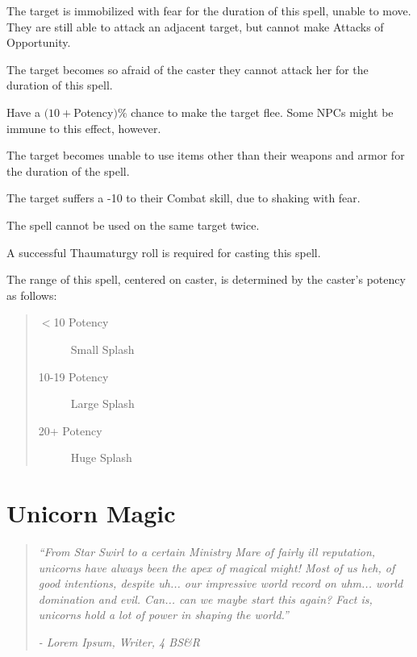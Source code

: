 \documentclass[11pt,a4paper,twocolumn]{book}
\begin{document}
\begin{compactitem}
	\item The target is immobilized with fear for the duration of this spell, unable to move. They are still able to attack an adjacent target, but cannot make Attacks of Opportunity.
	\item The target becomes so afraid of the caster they cannot attack her for the duration of this spell.
	\item Have a $(10 + $Potency$)\%$ chance to make the target flee. Some NPCs might be immune to this effect, however.
	\item The target becomes unable to use items other than their weapons and armor for the duration of the spell.
	\item The target suffers a -10 to their Combat skill, due to shaking with fear.
\end{compactitem}
\smallskip{}

The spell cannot be used on the same target twice.

A successful Thaumaturgy roll is required for casting this spell.

The range of this spell, centered on caster, is determined by the caster's potency as follows:
\begin{quote}
	\begin{description}
		\item[$<$10 Potency] 	Small Splash
		\item[10-19 Potency] 	Large Splash
		\item[20+ Potency] 	Huge Splash
	\end{description}	
\end{quote}   

\chapter{Unicorn Magic}
\begin{quote}
	\emph{``From Star Swirl to a certain Ministry Mare of fairly ill reputation, unicorns have always been the apex of magical might! Most of us heh, of good intentions, despite uh... our impressive world record on uhm... world domination and evil. Can... can we maybe start this again? Fact is, unicorns hold a lot of power in shaping the world.''}
	
	\emph{- Lorem Ipsum, Writer, 4 BS\&R}
\end{quote}
\end{document}
